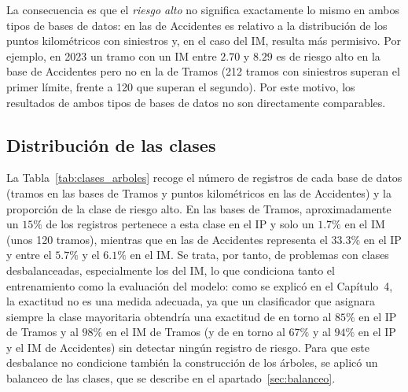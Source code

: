 \documentclass[twoside,a4paper,12pt,onecolumn,openany]{book}
\begin{document}
\vspace{0.5cm}
 
La consecuencia es que el \textit{riesgo alto} no significa exactamente lo mismo en ambos tipos de bases de datos: en las de Accidentes es relativo a la distribución de los puntos kilométricos con siniestros y, en el caso del IM, resulta más permisivo. Por ejemplo, en 2023 un tramo con un IM entre $2.70$ y $8.29$ es de riesgo alto en la base de Accidentes pero no en la de Tramos (212 tramos con siniestros superan el primer límite, frente a 120 que superan el segundo). Por este motivo, los resultados de ambos tipos de bases de datos no son directamente comparables.
 
\subsection{Distribución de las clases}
 
La Tabla~\ref{tab:clases_arboles} recoge el número de registros de cada base de datos (tramos en las bases de Tramos y puntos kilométricos en las de Accidentes) y la proporción de la clase de riesgo alto. En las bases de Tramos, aproximadamente un $15\%$ de los registros pertenece a esta clase en el IP y solo un $1.7\%$ en el IM (unos 120 tramos), mientras que en las de Accidentes representa el $33.3\%$ en el IP y entre el $5.7\%$ y el $6.1\%$ en el IM. Se trata, por tanto, de problemas con clases desbalanceadas, especialmente los del IM, lo que condiciona tanto el entrenamiento como la evaluación del modelo: como se explicó en el Capítulo~4, la exactitud no es una medida adecuada, ya que un clasificador que asignara siempre la clase mayoritaria obtendría una exactitud de en torno al $85\%$ en el IP de Tramos y al $98\%$ en el IM de Tramos (y de en torno al $67\%$ y al $94\%$ en el IP y el IM de Accidentes) sin detectar ningún registro de riesgo. Para que este desbalance no condicione también la construcción de los árboles, se aplicó un balanceo de las clases, que se describe en el apartado~\ref{sec:balanceo}.
 
\end{document}
